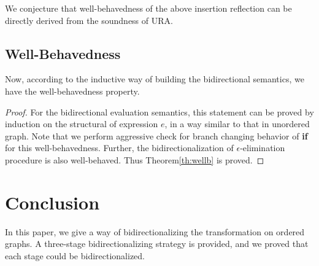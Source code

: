 \documentclass{llncs}
\begin{document}
We conjecture that well-behavedness of the above insertion reflection can be directly derived from the soundness of URA.

\subsection{Well-Behavedness}

Now, according to the inductive way of building the bidirectional semantics, we have the well-behavedness property.

\begin{proof}
For the bidirectional evaluation semantics, this statement can be proved by induction on the structural of expression $e$, in a way similar to that in unordered graph. Note that we perform aggressive check for branch changing behavior of \textbf{if} for this well-behavedness. Further, the bidirectionalization of $\epsilon$-elimination procedure is also well-behaved. Thus Theorem\ref{th:wellb} is proved.
\end{proof}

\section{Conclusion}\label{sec:con}

In this paper, we give a way of bidirectionalizing the transformation on ordered graphs. A three-stage bidirectionalizing strategy is provided, and we proved that each stage could be bidirectionalized. 
\end{document}
